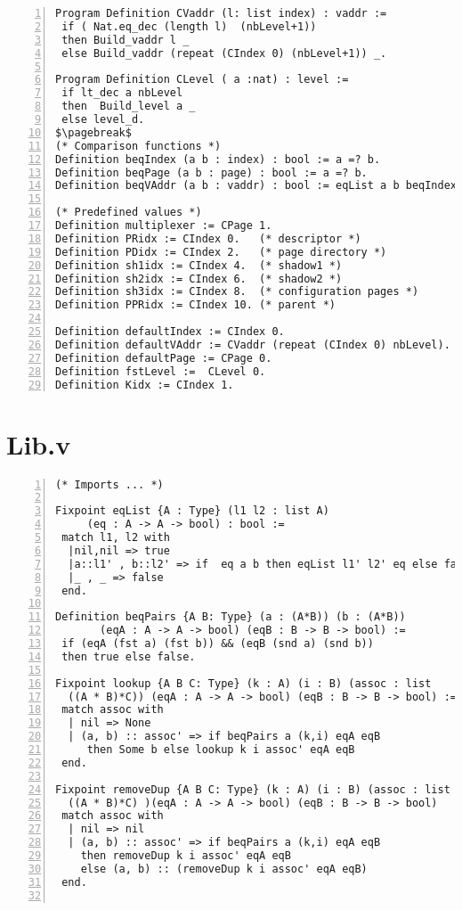 \begin{appendices}
\begin{lstlisting}[xleftmargin=-.1\textwidth,
xrightmargin=-.1\textwidth,
mathescape=true,numbers=left]
Program Definition CVaddr (l: list index) : vaddr := 
 if ( Nat.eq_dec (length l)  (nbLevel+1))  
 then Build_vaddr l _
 else Build_vaddr (repeat (CIndex 0) (nbLevel+1)) _.

Program Definition CLevel ( a :nat) : level := 
 if lt_dec a nbLevel 
 then  Build_level a _ 
 else level_d.
$\pagebreak$
(* Comparison functions *)
Definition beqIndex (a b : index) : bool := a =? b.
Definition beqPage (a b : page) : bool := a =? b.
Definition beqVAddr (a b : vaddr) : bool := eqList a b beqIndex.

(* Predefined values *)
Definition multiplexer := CPage 1.
Definition PRidx := CIndex 0.   (* descriptor *)
Definition PDidx := CIndex 2.   (* page directory *)
Definition sh1idx := CIndex 4.  (* shadow1 *) 
Definition sh2idx := CIndex 6.  (* shadow2 *)
Definition sh3idx := CIndex 8.  (* configuration pages *)
Definition PPRidx := CIndex 10. (* parent *)

Definition defaultIndex := CIndex 0.
Definition defaultVAddr := CVaddr (repeat (CIndex 0) nbLevel).
Definition defaultPage := CPage 0.
Definition fstLevel :=  CLevel 0.
Definition Kidx := CIndex 1.
\end{lstlisting}

\chapter{Lib.v} \label{LibFile}
\begin{lstlisting}[xleftmargin=-.1\textwidth,
xrightmargin=-.1\textwidth,
mathescape=true,numbers=left]
(* Imports ... *)

Fixpoint eqList {A : Type} (l1 l2 : list A) 
	 (eq : A -> A -> bool) : bool := 
 match l1, l2 with 
  |nil,nil => true
  |a::l1' , b::l2' => if  eq a b then eqList l1' l2' eq else false
  |_ , _ => false
 end.

Definition beqPairs {A B: Type} (a : (A*B)) (b : (A*B)) 
	   (eqA : A -> A -> bool) (eqB : B -> B -> bool) :=
 if (eqA (fst a) (fst b)) && (eqB (snd a) (snd b))  
 then true else false.

Fixpoint lookup {A B C: Type} (k : A) (i : B) (assoc : list 
  ((A * B)*C)) (eqA : A -> A -> bool) (eqB : B -> B -> bool) :=
 match assoc with
  | nil => None  
  | (a, b) :: assoc' => if beqPairs a (k,i) eqA eqB 
  	 then Some b else lookup k i assoc' eqA eqB
 end. 
 
Fixpoint removeDup {A B C: Type} (k : A) (i : B) (assoc : list 
  ((A * B)*C) )(eqA : A -> A -> bool) (eqB : B -> B -> bool)   :=
 match assoc with
  | nil => nil
  | (a, b) :: assoc' => if beqPairs a (k,i) eqA eqB 
  	then removeDup k i assoc' eqA eqB 
  	else (a, b) :: (removeDup k i assoc' eqA eqB)
 end.


\end{lstlisting}
\end{appendices}
